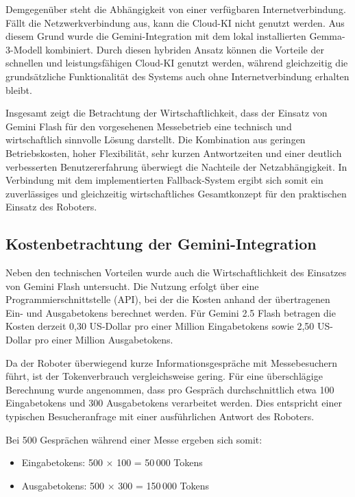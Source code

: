 Demgegenüber steht die Abhängigkeit von einer verfügbaren Internetverbindung. Fällt die Netzwerkverbindung aus, kann die Cloud-KI nicht genutzt werden. Aus diesem Grund wurde die Gemini-Integration mit dem lokal installierten Gemma-3-Modell kombiniert. Durch diesen hybriden Ansatz können die Vorteile der schnellen und leistungsfähigen Cloud-KI genutzt werden, während gleichzeitig die grundsätzliche Funktionalität des Systems auch ohne Internetverbindung erhalten bleibt.

Insgesamt zeigt die Betrachtung der Wirtschaftlichkeit, dass der Einsatz von Gemini Flash für den vorgesehenen Messebetrieb eine technisch und wirtschaftlich sinnvolle Lösung darstellt. Die Kombination aus geringen Betriebskosten, hoher Flexibilität, sehr kurzen Antwortzeiten und einer deutlich verbesserten Benutzererfahrung überwiegt die Nachteile der Netzabhängigkeit. In Verbindung mit dem implementierten Fallback-System ergibt sich somit ein zuverlässiges und gleichzeitig wirtschaftliches Gesamtkonzept für den praktischen Einsatz des Roboters.

\subsection*{Kostenbetrachtung der Gemini-Integration}

Neben den technischen Vorteilen wurde auch die Wirtschaftlichkeit des Einsatzes von Gemini Flash untersucht. Die Nutzung erfolgt über eine Programmierschnittstelle (API), bei der die Kosten anhand der übertragenen Ein- und Ausgabetokens berechnet werden. Für Gemini 2.5 Flash betragen die Kosten derzeit 0,30 US-Dollar pro einer Million Eingabetokens sowie 2,50 US-Dollar pro einer Million Ausgabetokens.

Da der Roboter überwiegend kurze Informationsgespräche mit Messebesuchern führt, ist der Tokenverbrauch vergleichsweise gering. Für eine überschlägige Berechnung wurde angenommen, dass pro Gespräch durchschnittlich etwa 100 Eingabetokens und 300 Ausgabetokens verarbeitet werden. Dies entspricht einer typischen Besucheranfrage mit einer ausführlichen Antwort des Roboters.

Bei 500 Gesprächen während einer Messe ergeben sich somit:

\begin{itemize}
	\item Eingabetokens: 500 $\times$ 100 = 50\,000 Tokens
	\item Ausgabetokens: 500 $\times$ 300 = 150\,000 Tokens
\end{itemize}

